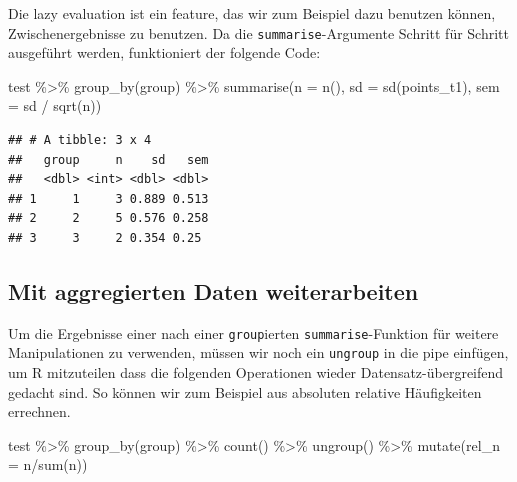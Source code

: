 \documentclass[
]{book}
\newenvironment{Shaded}{\begin{snugshade}}{\end{snugshade}}
\newcommand{\AttributeTok}[1]{\textcolor[rgb]{0.77,0.63,0.00}{#1}}
\newcommand{\FunctionTok}[1]{\textcolor[rgb]{0.00,0.00,0.00}{#1}}
\newcommand{\NormalTok}[1]{#1}
\newcommand{\SpecialCharTok}[1]{\textcolor[rgb]{0.00,0.00,0.00}{#1}}
\begin{document}
Die lazy evaluation ist ein feature, das wir zum Beispiel dazu benutzen können, Zwischenergebnisse zu benutzen.
Da die \texttt{summarise}-Argumente Schritt für Schritt ausgeführt werden, funktioniert der folgende Code:

\begin{Shaded}
\begin{Highlighting}[]
\NormalTok{test }\SpecialCharTok{\%\textgreater{}\%} 
  \FunctionTok{group\_by}\NormalTok{(group) }\SpecialCharTok{\%\textgreater{}\%} 
  \FunctionTok{summarise}\NormalTok{(}\AttributeTok{n =} \FunctionTok{n}\NormalTok{(),}
            \AttributeTok{sd =} \FunctionTok{sd}\NormalTok{(points\_t1),}
            \AttributeTok{sem =}\NormalTok{ sd }\SpecialCharTok{/} \FunctionTok{sqrt}\NormalTok{(n))}
\end{Highlighting}
\end{Shaded}

\begin{verbatim}
## # A tibble: 3 x 4
##   group     n    sd   sem
##   <dbl> <int> <dbl> <dbl>
## 1     1     3 0.889 0.513
## 2     2     5 0.576 0.258
## 3     3     2 0.354 0.25
\end{verbatim}

\hypertarget{mit-aggregierten-daten-weiterarbeiten}{%
\subsection{Mit aggregierten Daten weiterarbeiten}\label{mit-aggregierten-daten-weiterarbeiten}}

Um die Ergebnisse einer nach einer \texttt{group}ierten \texttt{summarise}-Funktion für weitere Manipulationen zu verwenden, müssen wir noch ein \texttt{ungroup} in die pipe einfügen, um R mitzuteilen dass die folgenden Operationen wieder Datensatz-übergreifend gedacht sind. So können wir zum Beispiel aus absoluten relative Häufigkeiten errechnen.

\begin{Shaded}
\begin{Highlighting}[]
\NormalTok{test }\SpecialCharTok{\%\textgreater{}\%} 
  \FunctionTok{group\_by}\NormalTok{(group) }\SpecialCharTok{\%\textgreater{}\%}
  \FunctionTok{count}\NormalTok{() }\SpecialCharTok{\%\textgreater{}\%} 
  \FunctionTok{ungroup}\NormalTok{() }\SpecialCharTok{\%\textgreater{}\%} 
  \FunctionTok{mutate}\NormalTok{(}\AttributeTok{rel\_n =}\NormalTok{ n}\SpecialCharTok{/}\FunctionTok{sum}\NormalTok{(n))}
\end{Highlighting}
\end{Shaded}
\end{document}
